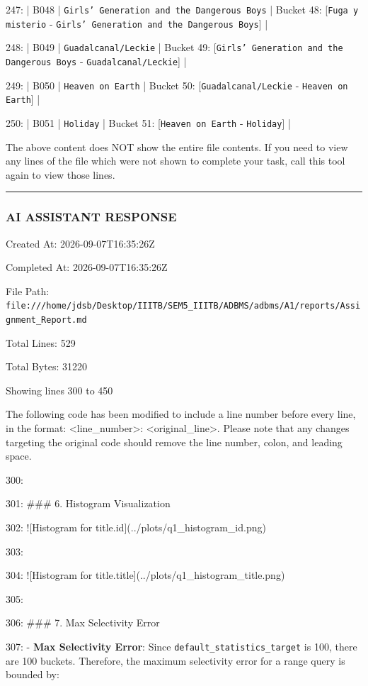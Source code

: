 \documentclass[11pt,a4paper]{article}
\begin{document}
247: | B048 | \texttt{Girls' Generation and the Dangerous Boys} | Bucket 48: [\texttt{Fuga y misterio} - \texttt{Girls' Generation and the Dangerous Boys}] |

248: | B049 | \texttt{Guadalcanal/Leckie} | Bucket 49: [\texttt{Girls' Generation and the Dangerous Boys} - \texttt{Guadalcanal/Leckie}] |

249: | B050 | \texttt{Heaven on Earth} | Bucket 50: [\texttt{Guadalcanal/Leckie} - \texttt{Heaven on Earth}] |

250: | B051 | \texttt{Holiday} | Bucket 51: [\texttt{Heaven on Earth} - \texttt{Holiday}] |

The above content does NOT show the entire file contents. If you need to view any lines of the file which were not shown to complete your task, call this tool again to view those lines.


\hrule

\subsubsection{AI ASSISTANT RESPONSE}

Created At: 2026-09-07T16:35:26Z

Completed At: 2026-09-07T16:35:26Z

File Path: \texttt{file:///home/jdsb/Desktop/IIITB/SEM5\_IIITB/ADBMS/adbms/A1/reports/Assignment\_Report.md}

Total Lines: 529

Total Bytes: 31220

Showing lines 300 to 450

The following code has been modified to include a line number before every line, in the format: <line\_number>: <original\_line>. Please note that any changes targeting the original code should remove the line number, colon, and leading space.

300:

301: \#\#\# 6. Histogram Visualization

302: ![Histogram for title.id](../plots/q1\_histogram\_id.png)

303:

304: ![Histogram for title.title](../plots/q1\_histogram\_title.png)

305:

306: \#\#\# 7. Max Selectivity Error

307: - \textbf{Max Selectivity Error}: Since \texttt{default\_statistics\_target} is 100, there are 100 buckets. Therefore, the maximum selectivity error for a range query is bounded by:
\end{document}
